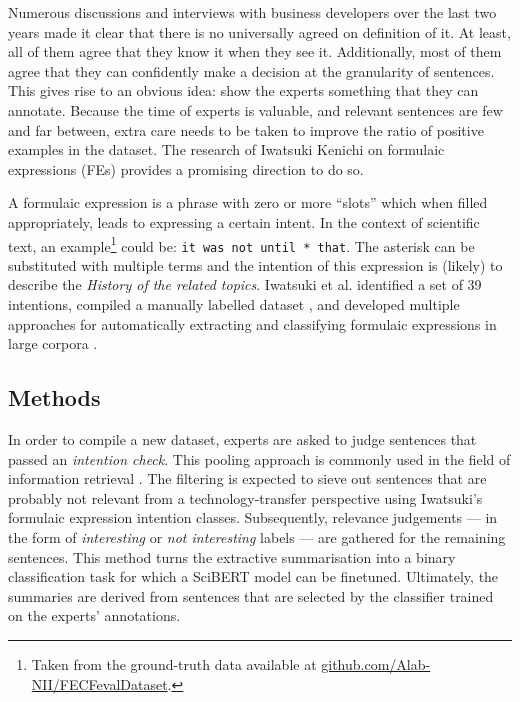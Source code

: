 Numerous discussions and interviews with business developers over the last two years made it clear that there is no universally agreed on definition of it. At least, all of them agree that they know it when they see it. Additionally, most of them agree that they can confidently make a decision at the granularity of sentences. This gives rise to an obvious idea: show the experts something that they can annotate. Because the time of experts is valuable, and relevant sentences are few and far between, extra care needs to be taken to improve the ratio of positive examples in the dataset. The research of Iwatsuki Kenichi on formulaic expressions (FEs) \cite{iwatsuki2020evaluation,iwatsuki2021extraction,iwatsuki2021communicative,iwatsuki2022extraction} provides a promising direction to do so. 

A formulaic expression is a phrase with zero or more ``slots'' which when filled appropriately, leads to expressing a certain intent. In the context of scientific text, an example\footnote{Taken from the ground-truth data available at \href{https://github.com/Alab-NII/FECFevalDataset/blob/master/human_evaluation/background.tsv}{github.com/Alab-NII/FECFevalDataset}.} could be: \texttt{it was not until * that}. The asterisk can be substituted with multiple terms and the intention of this expression is (likely) to describe the \textit{History of the related topics}. Iwatsuki et al. identified a set of 39 intentions, compiled a manually labelled dataset \cite{iwatsuki2020evaluation}, and developed multiple approaches for automatically extracting and classifying formulaic expressions in large corpora \cite{iwatsuki2021communicative,iwatsuki2022extraction}.

\subsection{Methods}

In order to compile a new dataset, experts are asked to judge sentences that passed an \textit{intention check}. This pooling approach is commonly used in the field of information retrieval \cite{schutze2008introduction}. The filtering is expected to sieve out sentences that are probably not relevant from a technology-transfer perspective using Iwatsuki's formulaic expression intention classes. Subsequently, relevance judgements --- in the form of \textit{interesting} or \textit{not interesting} labels --- are gathered for the remaining sentences. This method turns the extractive summarisation into a binary classification task for which a SciBERT model \cite{beltagy2019scibert} can be finetuned. Ultimately, the summaries are derived from sentences that are selected by the classifier trained on the experts' annotations.

